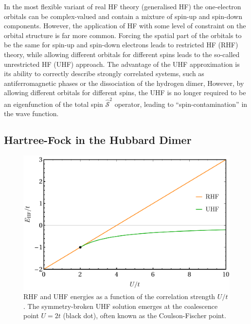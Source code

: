 \documentclass[aps,prb,reprint,noshowkeys,linenumbers,superscriptaddress]{revtex4-1}
\begin{document}
In the most flexible variant of real HF theory (generalised HF) the one-electron orbitals can be complex-valued
and contain a mixture of spin-up and spin-down components.\cite{Mayer_1993,Jimenez-Hoyos_2011}
However, the application of HF with some level of constraint on the orbital structure is far more common.
Forcing the spatial part of the orbitals to be the same for spin-up and spin-down electrons leads to restricted HF (RHF) theory, 
while allowing different orbitals for different spins leads to the so-called unrestricted HF (UHF) approach.\cite{StuberPaldus}
The advantage of the UHF approximation is its ability to correctly describe strongly correlated systems, 
such as antiferromagnetic phases\cite{Slater_1951} or the dissociation of the hydrogen dimer,\cite{Coulson_1949}
However, by allowing different orbitals for different spins, the UHF is no longer required to be an eigenfunction of 
the total spin $\hat{\mathcal{S}}^2$ operator, leading to ``spin-contamination'' in the wave function.

\subsection{Hartree-Fock in the Hubbard Dimer}
\label{sec:HF_hubbard}

\begin{figure}
    \includegraphics[width=\linewidth]{HF_real.pdf}
    \caption{\label{fig:HF_real}
    RHF and UHF energies as a function of the correlation strength $U/t$. 
    The symmetry-broken UHF solution emerges at the coalescence point $U=2t$ (black dot), often known as the Coulson-Fischer point.}
\end{figure}
\end{document}
